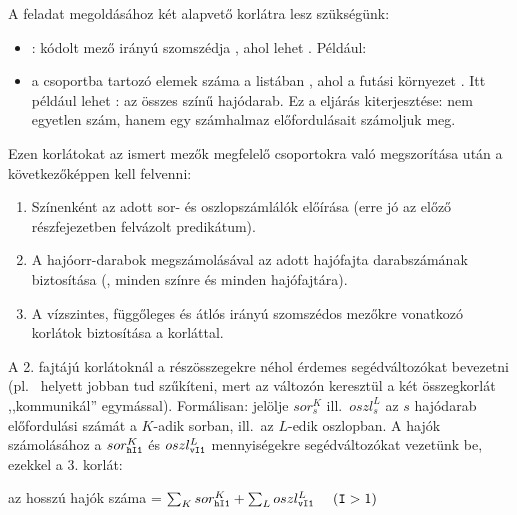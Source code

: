 A feladat megoldásához két alapvető korlátra lesz szükségünk:

\begin{itemize}
\item {}:  kódolt mező
 irányú szomszédja , ahol  lehet . Például:

\begin{prologcode}
| ?- coded_field_neighbour(horiz, 0, R).
R in \{3,4,7} ? ;
no
\end{prologcode}

\item {} a  csoportba
tartozó elemek száma a  listában , ahol a futási
környezet . Itt  például lehet : az összes
 színű hajódarab. Ez a  eljárás kiterjesztése: nem
egyetlen szám, hanem egy számhalmaz előfordulásait számoljuk meg.
\end{itemize}

Ezen korlátokat az ismert mezők megfelelő csoportokra való megszorítása
után a következőképpen kell felvenni:

\begin{enumerate}
\item Színenként az adott sor- és oszlopszámlálók előírása (erre jó az
előző részfejezetben felvázolt  predikátum).
\item A hajóorr-darabok megszámolásával az adott hajófajta darabszámának
biztosítása (, minden színre és minden hajófajtára).
\item A vízszintes, függőleges és átlós irányú szomszédos mezőkre vonatkozó
korlátok biztosítása a  korláttal.
\end{enumerate}

A 2. fajtájú korlátoknál a részösszegekre néhol érdemes segédváltozókat
bevezetni (pl.\  helyett  jobban tud szűkíteni, mert az  változón keresztül a
két összegkorlát ,,kommunikál'' egymással). Formálisan: jelölje $sor^K_s$
ill.\ $oszl^L_s$ az $s$ hajódarab előfordulási számát a $K$-adik sorban,
ill.\ az $L$-edik oszlopban. A hajók számolásához a $sor^K_{\tt hI1}$ és
$oszl^L_{\tt vI1}$ mennyiségekre segédváltozókat vezetünk be, ezekkel a 3. korlát:

\begin{center}
az  hosszú hajók száma =
$\sum_{K} sor^K_{\tt hI1} + \sum_{L} oszl^L_{\tt vI1} \ \ \ \ ({\tt I} > 1)$
\end{center}

